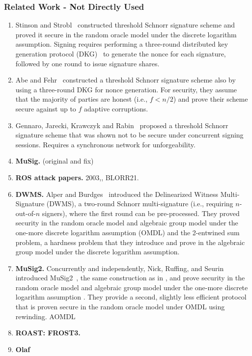 \subsubsection{Related Work - Not Directly Used}

\begin{enumerate}
\item Stinson and Strobl~\cite{StinsonS01} constructed  threshold Schnorr signature scheme and proved it secure in the random oracle model under the discrete logarithm assumption. Signing requires performing a three-round distributed key generation protocol (DKG)~\cite{GennaroJKR07}  to generate the nonce for each signature, followed by one round to issue signature shares. 
\item Abe and Fehr~\cite{AbeF04} constructed a threshold Schnorr signature scheme also by using a three-round DKG for nonce generation.
For security, they assume that the majority of parties are honest (i.e., $f < n/2$) and prove their scheme secure against up to $f$ adaptive corruptions. 
\item Gennaro, Jarecki, Krawczyk and Rabin~\cite{GennaroJKR01}  proposed a threshold Schnorr signature scheme that was shown not to be secure under concurrent signing sessions.  Requires a synchronous network for unforgeability.
\item \textbf{MuSig.} (original and fix)
\item \textbf{ROS attack papers.} 2003,\cite{cryptoeprint:2018/417,DrijversEFKLNS19}, BLORR21. 
\item \textbf{DWMS.} Alper and Burdges~\cite{AlperB21} introduced the Delinearized Witness Multi-Signature (DWMS), a two-round Schnorr multi-signature (i.e., requiring $n$-out-of-$n$ signers), where the first round can be pre-processed.  They proved security in the random oracle model and algebraic group model under the one-more discrete logarithm assumption (OMDL) and the 2-entwined sum problem, a hardness problem that they introduce and prove in the algebraic group model under the discrete logarithm assumption.
\item \textbf{MuSig2.} Concurrently and independently, Nick, Ruffing, and Seurin introduced MuSig2~\cite{NickRS21}, the same construction as in \cite{AlperB21}, and prove security in the random oracle model and algebraic group model under the one-more discrete logarithm assumption .  They provide a second, slightly less efficient protocol that is proven secure in the random oracle model under OMDL using rewinding.
AOMDL
\item \textbf{ROAST: FROST3.} 
\item \textbf{Olaf}
\end{enumerate}

